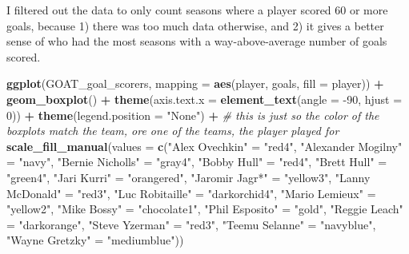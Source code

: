\documentclass[
]{article}
\newenvironment{Shaded}{\begin{snugshade}}{\end{snugshade}}
\newcommand{\CommentTok}[1]{\textcolor[rgb]{0.56,0.35,0.01}{\textit{#1}}}
\newcommand{\DataTypeTok}[1]{\textcolor[rgb]{0.13,0.29,0.53}{#1}}
\newcommand{\DecValTok}[1]{\textcolor[rgb]{0.00,0.00,0.81}{#1}}
\newcommand{\KeywordTok}[1]{\textcolor[rgb]{0.13,0.29,0.53}{\textbf{#1}}}
\newcommand{\NormalTok}[1]{#1}
\newcommand{\OperatorTok}[1]{\textcolor[rgb]{0.81,0.36,0.00}{\textbf{#1}}}
\newcommand{\StringTok}[1]{\textcolor[rgb]{0.31,0.60,0.02}{#1}}
\begin{document}
I filtered out the data to only count seasons where a player scored 60
or more goals, because 1) there was too much data otherwise, and 2) it
gives a better sense of who had the most seasons with a
way-above-average number of goals scored.

\begin{Shaded}
\begin{Highlighting}[]
\KeywordTok{ggplot}\NormalTok{(GOAT_goal_scorers, }\DataTypeTok{mapping =} \KeywordTok{aes}\NormalTok{(player, goals, }\DataTypeTok{fill =}\NormalTok{ player)) }\OperatorTok{+}
\StringTok{  }\KeywordTok{geom_boxplot}\NormalTok{() }\OperatorTok{+}
\StringTok{  }\KeywordTok{theme}\NormalTok{(}\DataTypeTok{axis.text.x =} \KeywordTok{element_text}\NormalTok{(}\DataTypeTok{angle =} \DecValTok{-90}\NormalTok{, }\DataTypeTok{hjust =} \DecValTok{0}\NormalTok{)) }\OperatorTok{+}
\StringTok{  }\KeywordTok{theme}\NormalTok{(}\DataTypeTok{legend.position =} \StringTok{"None"}\NormalTok{) }\OperatorTok{+}
\StringTok{  }\CommentTok{# this is just so the color of the boxplots match the team, ore one of the teams, the player played for}
\StringTok{  }\KeywordTok{scale_fill_manual}\NormalTok{(}\DataTypeTok{values =} \KeywordTok{c}\NormalTok{(}\StringTok{"Alex Ovechkin"}\NormalTok{ =}\StringTok{ "red4"}\NormalTok{, }\StringTok{"Alexander Mogilny"}\NormalTok{ =}\StringTok{ "navy"}\NormalTok{, }\StringTok{"Bernie Nicholls"}\NormalTok{ =}\StringTok{ "gray4"}\NormalTok{, }\StringTok{"Bobby Hull"}\NormalTok{ =}\StringTok{ "red4"}\NormalTok{, }\StringTok{"Brett Hull"}\NormalTok{ =}\StringTok{ "green4"}\NormalTok{, }\StringTok{"Jari Kurri"}\NormalTok{ =}\StringTok{ "orangered"}\NormalTok{, }\StringTok{"Jaromir Jagr*"}\NormalTok{ =}\StringTok{ "yellow3"}\NormalTok{, }\StringTok{"Lanny McDonald"}\NormalTok{ =}\StringTok{ "red3"}\NormalTok{, }\StringTok{"Luc Robitaille"}\NormalTok{ =}\StringTok{ "darkorchid4"}\NormalTok{, }\StringTok{"Mario Lemieux"}\NormalTok{ =}\StringTok{ "yellow2"}\NormalTok{, }\StringTok{"Mike Bossy"}\NormalTok{ =}\StringTok{ "chocolate1"}\NormalTok{, }\StringTok{"Phil Esposito"}\NormalTok{ =}\StringTok{ "gold"}\NormalTok{, }\StringTok{"Reggie Leach"}\NormalTok{ =}\StringTok{ "darkorange"}\NormalTok{,  }\StringTok{"Steve Yzerman"}\NormalTok{ =}\StringTok{ "red3"}\NormalTok{, }\StringTok{"Teemu Selanne"}\NormalTok{ =}\StringTok{ "navyblue"}\NormalTok{, }\StringTok{"Wayne Gretzky"}\NormalTok{ =}\StringTok{ "mediumblue"}\NormalTok{))}
\end{Highlighting}
\end{Shaded}
\end{document}
